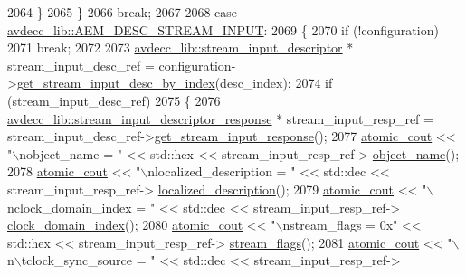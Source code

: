 \begin{DoxyCode}
2064         \}
2065     \}
2066     \textcolor{keywordflow}{break};
2067 
2068     \textcolor{keywordflow}{case} \hyperlink{namespaceavdecc__lib_ac7b7d227e46bc72b63ee9e9aae15902fa00d002e47651a1b007d50f9f2da51e53}{avdecc\_lib::AEM\_DESC\_STREAM\_INPUT}:
2069     \{
2070         \textcolor{keywordflow}{if} (!configuration)
2071             \textcolor{keywordflow}{break};
2072 
2073         \hyperlink{classavdecc__lib_1_1stream__input__descriptor}{avdecc\_lib::stream\_input\_descriptor} * stream\_input\_desc\_ref = 
      configuration->\hyperlink{classavdecc__lib_1_1configuration__descriptor_a69cfe9032cea21937b4153878f8a925c}{get\_stream\_input\_desc\_by\_index}(desc\_index);
2074         \textcolor{keywordflow}{if} (stream\_input\_desc\_ref)
2075         \{
2076             \hyperlink{classavdecc__lib_1_1stream__input__descriptor__response}{avdecc\_lib::stream\_input\_descriptor\_response} * 
      stream\_input\_resp\_ref = stream\_input\_desc\_ref->\hyperlink{classavdecc__lib_1_1stream__input__descriptor_a1be36084f46cee6b34b31b75e7667cc6}{get\_stream\_input\_response}();
2077             \hyperlink{cmd__line_8h_a0bc38ccc65c79ba06c6fcd7b4bf554c3}{atomic\_cout} << \textcolor{stringliteral}{"\(\backslash\)nobject\_name = "} << std::hex << stream\_input\_resp\_ref->
      \hyperlink{classavdecc__lib_1_1descriptor__response__base_a133f7774946d80f82b8aaaa4cfbb7361}{object\_name}();
2078             \hyperlink{cmd__line_8h_a0bc38ccc65c79ba06c6fcd7b4bf554c3}{atomic\_cout} << \textcolor{stringliteral}{"\(\backslash\)nlocalized\_description = "} << std::dec << stream\_input\_resp\_ref->
      \hyperlink{classavdecc__lib_1_1stream__input__descriptor__response_a1fb9de45567df344090a1407aa6b775f}{localized\_description}();
2079             \hyperlink{cmd__line_8h_a0bc38ccc65c79ba06c6fcd7b4bf554c3}{atomic\_cout} << \textcolor{stringliteral}{"\(\backslash\)nclock\_domain\_index = "} << std::dec << stream\_input\_resp\_ref->
      \hyperlink{classavdecc__lib_1_1stream__input__descriptor__response_aab7f93d403d8b73f8f4a8fb7c61ecded}{clock\_domain\_index}();
2080             \hyperlink{cmd__line_8h_a0bc38ccc65c79ba06c6fcd7b4bf554c3}{atomic\_cout} << \textcolor{stringliteral}{"\(\backslash\)nstream\_flags = 0x"} << std::hex << stream\_input\_resp\_ref->
      \hyperlink{classavdecc__lib_1_1stream__input__descriptor__response_aca4a27df506a50c80228271902f0091e}{stream\_flags}();
2081             \hyperlink{cmd__line_8h_a0bc38ccc65c79ba06c6fcd7b4bf554c3}{atomic\_cout} << \textcolor{stringliteral}{"\(\backslash\)n\(\backslash\)tclock\_sync\_source = "} << std::dec << stream\_input\_resp\_ref->

\end{DoxyCode}
